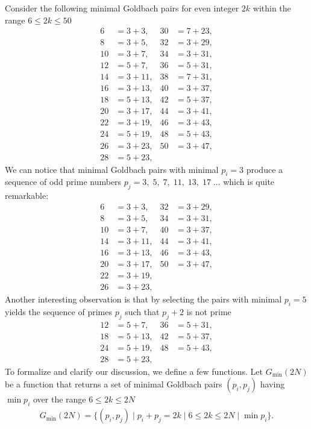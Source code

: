 Consider the following minimal Goldbach pairs for even integer $2k$ within the range $6 \leq 2k \leq 50$
\begin{align*}
    6  &= 3 + 3,   & 30 &= 7 + 23, \\
    8  &= 3 + 5,   & 32 &= 3 + 29, \\
    10 &= 3 + 7,   & 34 &= 3 + 31, \\
    12 &= 5 + 7,   & 36 &= 5 + 31, \\
    14 &= 3 + 11,  & 38 &= 7 + 31, \\
    16 &= 3 + 13,  & 40 &= 3 + 37, \\
    18 &= 5 + 13,  & 42 &= 5 + 37, \\
    20 &= 3 + 17,  & 44 &= 3 + 41, \\
    22 &= 3 + 19,  & 46 &= 3 + 43, \\
    24 &= 5 + 19,  & 48 &= 5 + 43, \\
    26 &= 3 + 23,  & 50 &= 3 + 47, \\
    28 &= 5 + 23,  &
\end{align*}
We can notice that minimal Goldbach pairs with minimal $p_i=3$ produce a sequence of odd prime numbers
$p_j = 3, \; 5, \; 7, \; 11, \; 13, \; 17 \; \dots$ which is quite remarkable:
\begin{align*}
    6  &= 3 + 3,   & 32 &= 3 + 29, \\
    8  &= 3 + 5,   & 34 &= 3 + 31, \\
    10 &= 3 + 7,   & 40 &= 3 + 37, \\
    14 &= 3 + 11,  & 44 &= 3 + 41, \\
    16 &= 3 + 13,  & 46 &= 3 + 43, \\
    20 &= 3 + 17,  & 50 &= 3 + 47, \\
    22 &= 3 + 19,  &              \\
    26 &= 3 + 23,  &
\end{align*}
Another interesting observation is that by selecting the pairs with minimal $p_i=5$ yields
the sequence of primes $p_j$ such that $p_j+2$ is not prime
\begin{align*}
    12 &= 5 + 7,   & 36 &= 5 + 31, \\
    18 &= 5 + 13,  & 42 &= 5 + 37, \\
    24 &= 5 + 19,  & 48 &= 5 + 43, \\
    28 &= 5 + 23,  &
\end{align*}
To formalize and clarify our discussion, we define a few functions.
Let $G_{\min} (2N)$ be a function that returns a set of minimal Goldbach pairs $(p_i, p_j)$ having $\min p_i$
over the range $6 \leq 2k \leq 2N$
\begin{align*}
    G_{\min} (2N) = \{(p_i, p_j) \mid p_i + p_j = 2k \mid 6 \leq 2k \leq 2N \mid \min p_i \}.
\end{align*}

